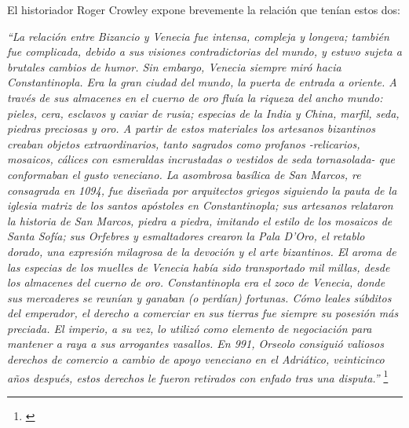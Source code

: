 El historiador Roger Crowley expone brevemente la relación 
que tenían estos dos:

\textit{“La relación entre Bizancio y Venecia fue intensa, compleja y longeva; 
también fue complicada, debido a sus visiones contradictorias del mundo, 
y estuvo sujeta a brutales cambios de humor. Sin embargo, Venecia siempre 
miró hacia Constantinopla. Era la gran ciudad del mundo, la puerta de 
entrada a oriente. A través de sus almacenes en el cuerno de oro fluía 
la riqueza del ancho mundo: pieles, cera, esclavos y caviar de rusia; 
especias de la India y China, marfil, seda, piedras preciosas y oro. 
A partir de estos materiales los artesanos bizantinos creaban objetos 
extraordinarios, tanto sagrados como profanos -relicarios, mosaicos, 
cálices con esmeraldas incrustadas o vestidos de seda tornasolada- 
que conformaban el gusto veneciano. La asombrosa basílica de San Marcos, 
re consagrada en 1094, fue diseñada por arquitectos griegos siguiendo la 
pauta de la iglesia matriz de los santos apóstoles en Constantinopla; 
sus artesanos relataron la historia de San Marcos, piedra a piedra, 
imitando el estilo de los mosaicos de Santa Sofía; sus Orfebres y 
esmaltadores crearon la Pala D’Oro, el retablo dorado, una expresión 
milagrosa de la devoción y el arte bizantinos. 
El aroma de las especias de los muelles de Venecia había sido 
transportado mil millas, desde los almacenes del cuerno de oro. 
Constantinopla era el zoco de Venecia, donde sus mercaderes se reunían y
 ganaban (o perdían) fortunas. Cómo leales súbditos del emperador, 
 el derecho a comerciar en sus tierras fue siempre su posesión 
 más preciada. El imperio, a su vez, lo utilizó como elemento de 
 negociación para mantener a raya a sus arrogantes vasallos. 
 En 991, Orseolo consiguió valiosos derechos de comercio a cambio 
 de apoyo veneciano en el Adriático, veinticinco años después, 
 estos derechos le fueron retirados con enfado tras una disputa.”
 }\footnote{\cite[pp.~39--40]{venecia}}













